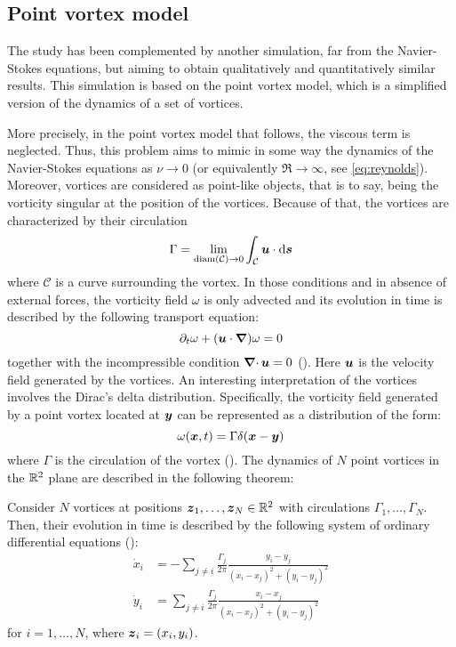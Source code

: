 \documentclass[../main.tex]{subfiles}
\begin{document}
\subsection{Point vortex model}
The study has been complemented by another simulation, far from the Navier-Stokes equations, but aiming to obtain qualitatively and quantitatively similar results. This simulation is based on the point vortex model, which is a simplified version of the dynamics of a set of vortices.

More precisely, in the point vortex model that follows, the viscous term is neglected. Thus, this problem aims to mimic in some way the dynamics of the Navier-Stokes equations as $\nu \to 0$ (or equivalently $\Re\to\infty$, see \cref{eq:reynolds}). Moreover, vortices are considered as point-like objects, that is to say, being the vorticity singular at the position of the vortices. Because of that, the vortices are characterized by their circulation
\begin{equation}
	\Gamma = \lim_{\operatorname{diam}(\mathcal{C})\to 0} \int_{\mathcal{C}} \boldsymbol{u} \cdot \dd{\boldsymbol{s}}
\end{equation}
where $\mathcal{C}$ is a curve surrounding the vortex. In those conditions and in absence of external forces, the vorticity field $\omega$ is only advected and its evolution in time is described by the following transport equation:
\begin{equation}
	\partial_t \omega + (\boldsymbol{u} \cdot \grad) \omega = 0
\end{equation}
together with the incompressible condition $\operatorname{\boldsymbol{\nabla}\cdot} \boldsymbol{u}=0$ (\cite{pointvortexmath}). Here $\boldsymbol{u}$ is the velocity field generated by the vortices. An interesting interpretation of the vortices involves the Dirac's delta distribution. Specifically, the vorticity field generated by a point vortex located at $\boldsymbol{y}$ can be represented as a distribution of the form:
\begin{equation}\label{eq:vorticity_delta}
	\omega(\boldsymbol{x}, t) = \Gamma \delta(\boldsymbol{x}-\boldsymbol{y})
\end{equation}
where $\Gamma$ is the circulation of the vortex (\cite{Saffman}). The dynamics of $N$ point vortices in the $\mathbb{R}^2$ plane are described in the following theorem:
\\
\begin{theorem}
	Consider $N$ vortices at positions $\boldsymbol{z}_1,\ldots,\boldsymbol{z}_N\in \mathbb{R}^2$ with circulations $\Gamma_1,\ldots,\Gamma_N$. Then, their evolution in time is described by the following system of ordinary differential equations (\cite{pointvortex}):
	\begin{align}\label{eq:pointvortexA}
		\dot{x}_i & = -\sum_{j\neq i} \frac{\Gamma_j}{2\pi} \frac{y_i-y_j}{{(x_i-x_j)}^2+{(y_i-y_j)}^2} \\
		\label{eq:pointvortexB}
		\dot{y}_i & = \sum_{j\neq i} \frac{\Gamma_j}{2\pi} \frac{x_i-x_j}{{(x_i-x_j)}^2+{(y_i-y_j)}^2}
	\end{align}
	for $i=1,\ldots,N$, where $\boldsymbol{z}_i=(x_i,y_i)$.
\end{theorem}
\end{document}
